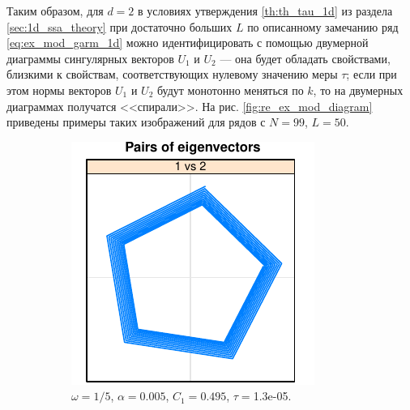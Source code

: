 \documentclass[specialist,
               substylefile = spbu.rtx,
               subf,href,colorlinks=true, 12pt]{disser}
\begin{document}
Таким образом, для $d=2$ в условиях утверждения \ref{th:th_tau_1d} из раздела \ref{sec:1d_ssa_theory} при достаточно больших $L$ по описанному замечанию ряд \eqref{eq:ex_mod_garm_1d} можно идентифицировать с помощью двумерной диаграммы сингулярных векторов $U_1$ и $U_2$ --- она будет обладать свойствами, близкими к свойствам, соответствующих нулевому значению меры $\tau$; если при этом нормы векторов $U_1$ и $U_2$ будут монотонно меняться по $k$, то на двумерных диаграммах получатся <<спирали>>. На рис. \ref{fig:re_ex_mod_diagram} приведены примеры таких изображений для рядов с $N=99$, $L=50$. 

\begin{figure}[h] 
    \centering
   \begin{subfigure}[b]{0.3\textwidth}
       \includegraphics[width=\textwidth]{re_ex_mod_omega_1_5}
        \caption{
        \centering $\omega=1/5$, $\alpha = 0.005$, $C_1 = 0.495$, $\tau =$1.3e-05.}
    \end{subfigure}
    \begin{subfigure}[b]{0.3\textwidth}

\end{subfigure}
\end{figure}
\end{document}
